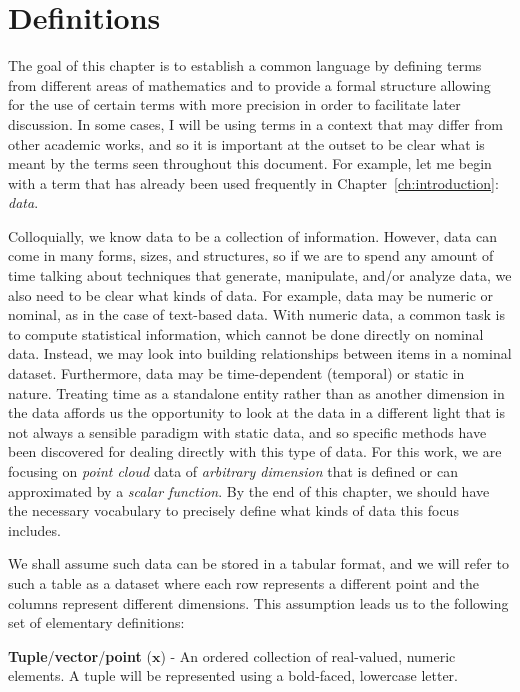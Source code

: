 
\chapter{Definitions}
\label{ch:definitions}

The goal of this chapter is to establish a common language by defining terms from different areas of mathematics and to provide a formal structure allowing for the use of certain terms with more precision in order to facilitate later discussion.
%
In some cases, I will be using terms in a context that may differ from other academic works, and so it is important at the outset to be clear what is meant by the terms seen throughout this document.
%
For example, let me begin with a term that has already been used frequently in Chapter~\ref{ch:introduction}: \emph{data}.

Colloquially, we know data to be a collection of information.
%
However, data can come in many forms, sizes, and structures, so if we are to spend any amount of time talking about techniques that generate, manipulate, and/or analyze data, we also need to be clear what kinds of data.
%
For example, data may be numeric or nominal, as in the case of text-based data.
%
With numeric data, a common task is to compute statistical information, which cannot be done directly on nominal data.
%
Instead, we may look into building relationships between items in a nominal dataset.
%
Furthermore, data may be time-dependent (temporal) or static in nature.
%
Treating time as a standalone entity rather than as another dimension in the data affords us the opportunity to look at the data in a different light that is not always a sensible paradigm with static data, and so specific methods have been discovered for dealing directly with this type of data.
%
For this work, we are focusing on \emph{point cloud} data of \emph{arbitrary dimension} that is defined or can approximated by a \emph{scalar function}.
%
By the end of this chapter, we should have the necessary vocabulary to precisely define what kinds of data this focus includes.

We shall assume such data can be stored in a tabular format, and we will refer to such a table as a dataset where each row represents a different point and the columns represent different dimensions. This assumption leads us to the following set of elementary definitions:

\begin{defn}
  \textbf{Tuple}/\textbf{vector}/\textbf{point} ($\mathbf{x}$) - An ordered collection of real-valued, numeric elements. A tuple will be represented using a bold-faced, lowercase letter.
\end{defn}

